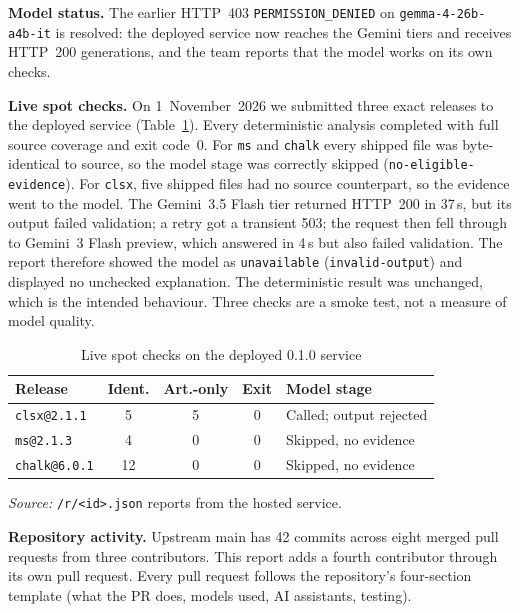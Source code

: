 \documentclass[conference]{IEEEtran}
\newcommand{\code}[1]{\texttt{#1}}
\begin{document}
\textbf{Model status.} The earlier HTTP~403 \code{PERMISSION\_DENIED} on
\code{gemma-4-26b-a4b-it} is resolved: the deployed service now reaches the
Gemini tiers and receives HTTP~200 generations, and the team reports that the
model works on its own checks.

\textbf{Live spot checks.} On 1~November~2026 we submitted three exact releases
to the deployed service (Table~\ref{tab:live}). Every deterministic analysis
completed with full source coverage and exit code~0. For \code{ms} and
\code{chalk} every shipped file was byte-identical to source, so the model stage
was correctly skipped (\code{no-eligible-evidence}). For \code{clsx}, five
shipped files had no source counterpart, so the evidence went to the model. The
Gemini~3.5 Flash tier returned HTTP~200 in 37\,s, but its output failed
validation; a retry got a transient 503; the request then fell through to
Gemini~3 Flash preview, which answered in 4\,s but also failed validation. The
report therefore showed the model as \code{unavailable} (\code{invalid-output})
and displayed no unchecked explanation. The deterministic result was unchanged,
which is the intended behaviour. Three checks are a smoke test, not a measure of
model quality.

\begin{table}[t]
\caption{Live spot checks on the deployed 0.1.0 service}
\label{tab:live}
\centering
\footnotesize
\begin{tabular}{@{}p{1.6cm}cccp{2.4cm}@{}}
\toprule
\textbf{Release} & \textbf{Ident.} & \textbf{Art.-only} & \textbf{Exit} & \textbf{Model stage}\\
\midrule
\code{clsx@2.1.1} & 5 & 5 & 0 & Called; output rejected\\
\code{ms@2.1.3} & 4 & 0 & 0 & Skipped, no evidence\\
\code{chalk@6.0.1} & 12 & 0 & 0 & Skipped, no evidence\\
\bottomrule
\end{tabular}
\vspace{1pt}

\textit{Source:} \code{/r/<id>.json} reports from the hosted service.
\end{table}

\textbf{Repository activity.} Upstream main has 42 commits across eight merged
pull requests from three contributors. This report adds a fourth contributor
through its own pull request. Every pull request follows the repository's
four-section template (what the PR does, models used, AI assistants, testing).
\end{document}
